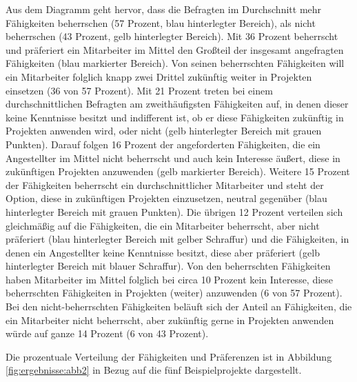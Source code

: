 Aus dem Diagramm geht hervor, dass die Befragten im Durchschnitt mehr Fähigkeiten beherrschen (57 Prozent, blau hinterlegter Bereich), als nicht beherrschen (43 Prozent, gelb hinterlegter Bereich).
Mit 36 Prozent beherrscht und präferiert ein Mitarbeiter im Mittel den Großteil der insgesamt angefragten Fähigkeiten (blau markierter Bereich).
Von seinen beherrschten Fähigkeiten will ein Mitarbeiter folglich knapp zwei Drittel zukünftig weiter in Projekten einsetzen (36 von 57 Prozent).
Mit 21 Prozent treten bei einem durchschnittlichen Befragten am zweithäufigsten Fähigkeiten auf, in denen dieser keine Kenntnisse besitzt und indifferent ist, ob er diese Fähigkeiten zukünftig in Projekten anwenden wird, oder nicht (gelb hinterlegter Bereich mit grauen Punkten).
Darauf folgen 16 Prozent der angeforderten Fähigkeiten, die ein Angestellter im Mittel nicht beherrscht und auch kein Interesse äußert, diese in zukünftigen Projekten anzuwenden (gelb markierter Bereich).
Weitere 15 Prozent der Fähigkeiten beherrscht ein durchschnittlicher Mitarbeiter und steht der Option, diese in zukünftigen Projekten einzusetzen, neutral gegenüber (blau hinterlegter Bereich mit grauen Punkten). 
Die übrigen 12 Prozent verteilen sich gleichmäßig auf die Fähigkeiten, die ein Mitarbeiter beherrscht, aber nicht präferiert (blau hinterlegter Bereich mit gelber Schraffur) und die Fähigkeiten, in denen ein Angestellter keine Kenntnisse besitzt, diese aber präferiert (gelb hinterlegter Bereich mit blauer Schraffur).
Von den beherrschten Fähigkeiten haben Mitarbeiter im Mittel folglich bei circa 10 Prozent kein Interesse, diese beherrschten Fähigkeiten in Projekten (weiter) anzuwenden (6 von 57 Prozent).
Bei den nicht-beherrschten Fähigkeiten beläuft sich der Anteil an Fähigkeiten, die ein Mitarbeiter nicht beherrscht, aber zukünftig gerne in Projekten anwenden würde auf ganze 14 Prozent (6 von 43 Prozent).

Die prozentuale Verteilung der Fähigkeiten und Präferenzen ist in Abbildung \ref{fig:ergebnisse:abb2} in Bezug auf die fünf Beispielprojekte dargestellt.

